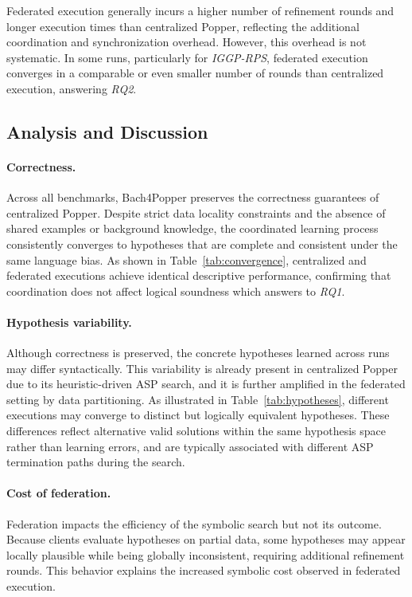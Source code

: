 Federated execution generally incurs a higher number of refinement rounds and longer execution times than centralized Popper, reflecting the additional coordination and synchronization overhead.
However, this overhead is not systematic.
In some runs, particularly for \textit{IGGP-RPS}, federated execution converges in a comparable or even smaller number of rounds than centralized execution, answering \textit{RQ2}.

\subsection{Analysis and Discussion}
\label{sec:discussion}

\paragraph{Correctness.}
Across all benchmarks, Bach4Popper preserves the correctness guarantees of centralized Popper.
Despite strict data locality constraints and the absence of shared examples or background knowledge, the coordinated learning process consistently converges to hypotheses that are complete and consistent under the same language bias.
As shown in Table~\ref{tab:convergence}, centralized and federated executions achieve identical descriptive performance, confirming that coordination does not affect logical soundness which answers to \textit{RQ1}.

\paragraph{Hypothesis variability.}
Although correctness is preserved, the concrete hypotheses learned across runs may differ syntactically.
This variability is already present in centralized Popper due to its heuristic-driven ASP search, and it is further amplified in the federated setting by data partitioning.
As illustrated in Table~\ref{tab:hypotheses}, different executions may converge to distinct but logically equivalent hypotheses.
These differences reflect alternative valid solutions within the same hypothesis space rather than learning errors, and are typically associated with different ASP termination paths during the search.

\paragraph{Cost of federation.}
Federation impacts the efficiency of the symbolic search but not its outcome. Because clients evaluate hypotheses on partial data, some hypotheses may appear locally plausible while being globally inconsistent, requiring additional refinement rounds.
This behavior explains the increased symbolic cost observed in federated execution.

